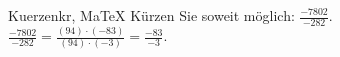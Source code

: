 \begin{MAufgabe}{Kuerzen}{kr, MaTeX}
K\"urzen Sie soweit m\"oglich: $\frac{-7802}{-282}$.\\ 
\ifLsg\MLoesung
\quad $\frac{-7802}{-282}=\frac{(94)\cdot(-83)}{(94)\cdot(-3)}=\frac{-83}{-3}$.\else\relax\fi
 \end{MAufgabe}